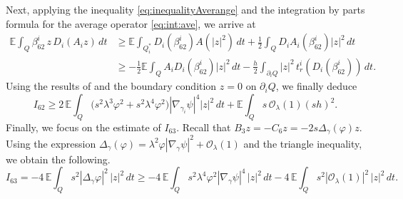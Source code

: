 \documentclass[11pt,oneside,leqno]{amsart}
\numberwithin{equation}{section}
\numberwithin{equation}{section}
\newcommand{\E}{\mathbb{E}}
\begin{document}
Next, applying the inequality \eqref{eq:inequalityAverange} and the integration by parts formula for the average operator \eqref{eq:int:ave}, we arrive at
\begin{align*}
\E \int_Q \beta_{62}^i \, z \, D_i(A_i z) \, dt 
&\geq \E \int_{Q_i^\ast} D_i(\beta_{62}^i) A(|z|^2) \, dt + \frac{1}{2} \int_Q D_i A_i (\beta_{62}^i) |z|^2 \, dt \\
&\geq - \frac{1}{2} \E \int_Q A_i D_i (\beta_{62}^i) |z|^2 \, dt - \frac{h}{2} \int_{\partial_i Q} |z|^2 \, t_r^i(D_i(\beta_{62}^i)) \, dt.
\end{align*}
Using the results of \cite{AA:perez:2024} and the boundary condition $z = 0$ on $\partial_i Q$, we finally deduce
\[
I_{62} \geq 2 \, \E \int_Q \big( s^2 \lambda^3 \varphi^2 + s^2 \lambda^4 \varphi^2 \big) |\nabla_{\gamma_i} \psi|^4 |z|^2 \, dt + \E \int_Q s \, \mathcal{O}_\lambda(1) (sh)^2.
\]
Finally, we focus on the estimate of $I_{63}$. Recall that $B_3 z = - C_6 z = -2 s \Delta_{\gamma}(\varphi) z.$ Using the expression $\Delta_{\gamma}(\varphi) = \lambda^2 \varphi |\nabla_{\gamma} \psi|^2 + \mathcal{O}_{\lambda}(1)$ and the triangle inequality, we obtain the following.
\begin{equation*}
I_{63} = -4 \, \E \int_Q s^2 |\Delta_{\gamma} \varphi|^2 \, |z|^2 \, dt 
\geq -4 \, \E \int_Q s^2 \lambda^4 \varphi^2 |\nabla_{\gamma} \psi|^4 \, |z|^2 \, dt 
- 4 \, \E \int_Q s^2|\mathcal{O}_{\lambda}(1)|^2 \, |z|^2 \, dt.
\end{equation*}
\end{document}
